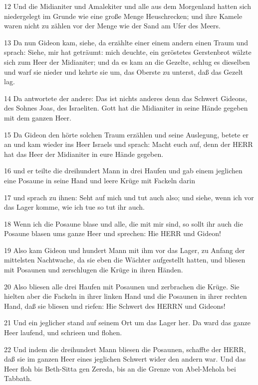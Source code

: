\par 12 Und die Midianiter und Amalekiter und alle aus dem Morgenland hatten sich niedergelegt im Grunde wie eine große Menge Heuschrecken; und ihre Kamele waren nicht zu zählen vor der Menge wie der Sand am Ufer des Meers.
\par 13 Da nun Gideon kam, siehe, da erzählte einer einem andern einen Traum und sprach: Siehe, mir hat geträumt: mich deuchte, ein geröstetes Gerstenbrot wälzte sich zum Heer der Midianiter; und da es kam an die Gezelte, schlug es dieselben und warf sie nieder und kehrte sie um, das Oberste zu unterst, daß das Gezelt lag.
\par 14 Da antwortete der andere: Das ist nichts anderes denn das Schwert Gideons, des Sohnes Joas, des Israeliten. Gott hat die Midianiter in seine Hände gegeben mit dem ganzen Heer.
\par 15 Da Gideon den hörte solchen Traum erzählen und seine Auslegung, betete er an und kam wieder ins Heer Israels und sprach: Macht euch auf, denn der HERR hat das Heer der Midianiter in eure Hände gegeben.
\par 16 und er teilte die dreihundert Mann in drei Haufen und gab einem jeglichen eine Posaune in seine Hand und leere Krüge mit Fackeln darin
\par 17 und sprach zu ihnen: Seht auf mich und tut auch also; und siehe, wenn ich vor das Lager komme, wie ich tue so tut ihr auch.
\par 18 Wenn ich die Posaune blase und alle, die mit mir sind, so sollt ihr auch die Posaune blasen ums ganze Heer und sprechen: Hie HERR und Gideon!
\par 19 Also kam Gideon und hundert Mann mit ihm vor das Lager, zu Anfang der mittelsten Nachtwache, da sie eben die Wächter aufgestellt hatten, und bliesen mit Posaunen und zerschlugen die Krüge in ihren Händen.
\par 20 Also bliesen alle drei Haufen mit Posaunen und zerbrachen die Krüge. Sie hielten aber die Fackeln in ihrer linken Hand und die Posaunen in ihrer rechten Hand, daß sie bliesen und riefen: Hie Schwert des HERRN und Gideons!
\par 21 Und ein jeglicher stand auf seinem Ort um das Lager her. Da ward das ganze Heer laufend, und schrieen und flohen.
\par 22 Und indem die dreihundert Mann bliesen die Posaunen, schaffte der HERR, daß sie im ganzen Heer eines jeglichen Schwert wider den andern war. Und das Heer floh bis Beth-Sitta gen Zereda, bis an die Grenze von Abel-Mehola bei Tabbath.

